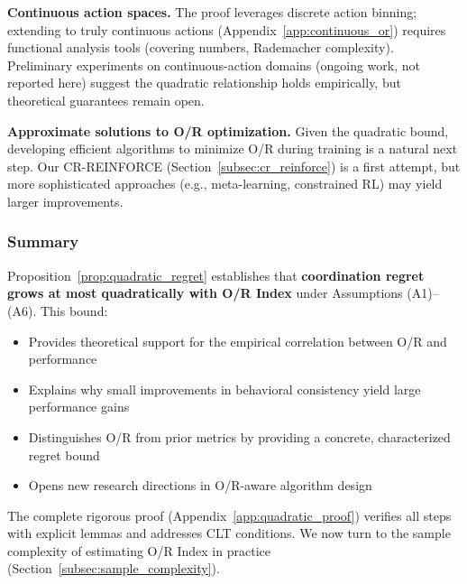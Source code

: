 \textbf{Continuous action spaces.} The proof leverages discrete action binning; extending to truly continuous actions (Appendix~\ref{app:continuous_or}) requires functional analysis tools (covering numbers, Rademacher complexity). Preliminary experiments on continuous-action domains (ongoing work, not reported here) suggest the quadratic relationship holds empirically, but theoretical guarantees remain open.

\textbf{Approximate solutions to O/R optimization.} Given the quadratic bound, developing efficient algorithms to minimize O/R during training is a natural next step. Our CR-REINFORCE (Section~\ref{subsec:cr_reinforce}) is a first attempt, but more sophisticated approaches (e.g., meta-learning, constrained RL) may yield larger improvements.

\subsubsection{Summary}

Proposition~\ref{prop:quadratic_regret} establishes that \textbf{coordination regret grows at most quadratically with O/R Index} under Assumptions (A1)--(A6). This bound:

\begin{itemize}
    \item Provides theoretical support for the empirical correlation between O/R and performance
    \item Explains why small improvements in behavioral consistency yield large performance gains
    \item Distinguishes O/R from prior metrics by providing a concrete, characterized regret bound
    \item Opens new research directions in O/R-aware algorithm design
\end{itemize}

The complete rigorous proof (Appendix~\ref{app:quadratic_proof}) verifies all steps with explicit lemmas and addresses CLT conditions. We now turn to the sample complexity of estimating O/R Index in practice (Section~\ref{subsec:sample_complexity}).

